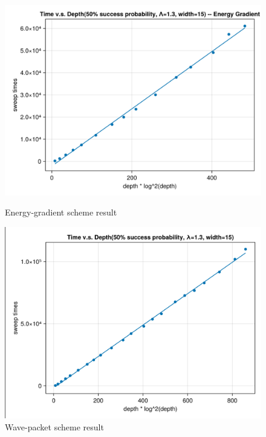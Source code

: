 \documentclass[twocolumn,superscriptaddress,english,showpacs,longbibliography]{revtex4-2}
\begin{document}
\begin{figure}[h]
    \centering
    \begin{minipage}{0.48\linewidth} 
        \centering
        \includegraphics[width=\linewidth]{../notes/images/toy_model_gradient_time_vs_depth_1_3.png} 
        \caption{Energy-gradient scheme result}
        \label{fig:image1}
    \end{minipage}
    \begin{minipage}{0.48\linewidth} 
        \centering
        \includegraphics[width=\linewidth]{../notes/images/toy_model_wave_packet_time_vs_depth_1_3.png}
        \caption{Wave-packet scheme result}
        \label{fig:image2}
    \end{minipage}
\end{figure}
\end{document}
